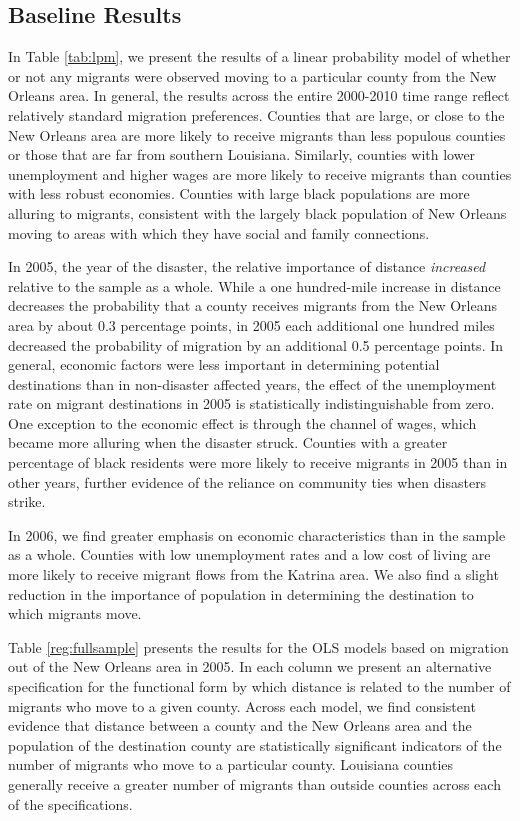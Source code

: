 \documentclass[]{article}
\begin{document}
\subsection{Baseline Results}\label{baseline-results}

In Table \ref{tab:lpm}, we present the results of a linear probability
model of whether or not any migrants were observed moving to a
particular county from the New Orleans area. In general, the results
across the entire 2000-2010 time range reflect relatively standard
migration preferences. Counties that are large, or close to the New
Orleans area are more likely to receive migrants than less populous
counties or those that are far from southern Louisiana. Similarly,
counties with lower unemployment and higher wages are more likely to
receive migrants than counties with less robust economies. Counties with
large black populations are more alluring to migrants, consistent with
the largely black population of New Orleans moving to areas with which
they have social and family connections.

In 2005, the year of the disaster, the relative importance of distance
\emph{increased} relative to the sample as a whole. While a one
hundred-mile increase in distance decreases the probability that a
county receives migrants from the New Orleans area by about 0.3
percentage points, in 2005 each additional one hundred miles decreased
the probability of migration by an additional 0.5 percentage points. In
general, economic factors were less important in determining potential
destinations than in non-disaster affected years, the effect of the
unemployment rate on migrant destinations in 2005 is statistically
indistinguishable from zero. One exception to the economic effect is
through the channel of wages, which became more alluring when the
disaster struck. Counties with a greater percentage of black residents
were more likely to receive migrants in 2005 than in other years,
further evidence of the reliance on community ties when disasters
strike.

In 2006, we find greater emphasis on economic characteristics than in
the sample as a whole. Counties with low unemployment rates and a low
cost of living are more likely to receive migrant flows from the Katrina
area. We also find a slight reduction in the importance of population in
determining the destination to which migrants move.

Table \ref{reg:fullsample} presents the results for the OLS models based
on migration out of the New Orleans area in 2005. In each column we
present an alternative specification for the functional form by which
distance is related to the number of migrants who move to a given
county. Across each model, we find consistent evidence that distance
between a county and the New Orleans area and the population of the
destination county are statistically significant indicators of the
number of migrants who move to a particular county. Louisiana counties
generally receive a greater number of migrants than outside counties
across each of the specifications.
\end{document}
